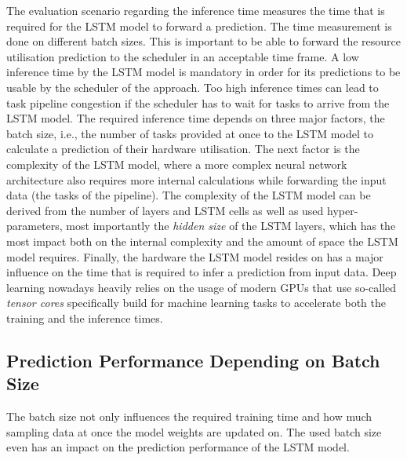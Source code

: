     The evaluation scenario regarding the inference time measures the time that is required for the LSTM model to forward a prediction.
    The time measurement is done on different batch sizes. This is important to be able to forward the resource utilisation prediction to the scheduler in an acceptable time frame.
    A low inference time by the LSTM model is mandatory in order for its predictions to be usable by the scheduler of the  approach. Too high inference times can lead to task pipeline congestion if the scheduler has to wait for tasks to arrive from the LSTM model.
    The required inference time depends on three major factors, the batch size, i.e., the number of tasks provided at once to the LSTM model to calculate a prediction of their hardware utilisation.
    The next factor is the complexity of the LSTM model, where a more complex neural network architecture also requires more internal calculations while forwarding the input data (the tasks of the pipeline). The complexity of the LSTM model can be derived from the number of layers and LSTM cells as well as used hyper-parameters, most importantly the \emph{hidden size} of the LSTM layers, which has the most impact both on the internal complexity and the amount of space the LSTM model requires.
    Finally, the hardware the LSTM model resides on has a major influence on the time that is required to infer a prediction from input data. Deep learning nowadays heavily relies on the usage of modern GPUs that use so-called \emph{tensor cores} specifically build for machine learning tasks to accelerate both the training and the inference times.


  \subsection{Prediction Performance Depending on Batch Size}
  \label{sec:prediction-performance-depending-on-batch-size-evaluation-scenarios}






  The batch size not only influences the required training time and how much sampling data at once the model weights are updated on. The used batch size even has an impact on the prediction performance of the LSTM model.
    
  
